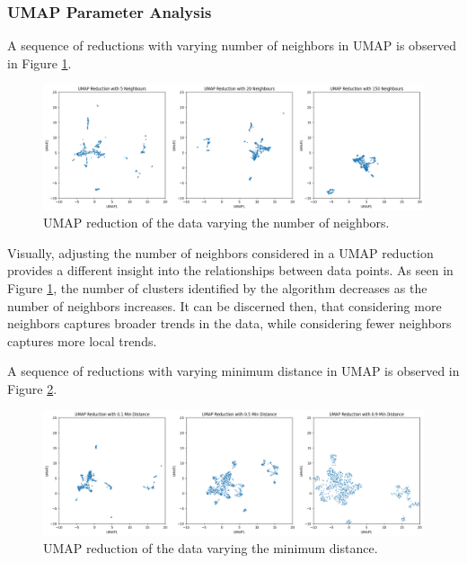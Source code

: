 \documentclass[12pt]{article}
\begin{document}
\subsubsection{UMAP Parameter Analysis}
A sequence of reductions with varying number of neighbors in UMAP is observed in Figure \ref{fig:UMAP_vary}.

\begin{figure}[H]
    \centering
    \includegraphics[width=\textwidth]{Images/UMAP_vary.png}
    \caption{UMAP reduction of the data varying the number of neighbors.}
    \label{fig:UMAP_vary}
\end{figure}

\vspace{-0.5cm}

Visually, adjusting the number of neighbors considered in a UMAP reduction provides a different insight into the relationships between data points. As seen in Figure \ref{fig:UMAP_vary}, the number of clusters identified by the algorithm decreases as the number of neighbors increases. It can be discerned then, that considering more neighbors captures broader trends in the data, while considering fewer neighbors captures more local trends.

A sequence of reductions with varying minimum distance in UMAP is observed in Figure \ref{fig:UMAP_vary2}.

\begin{figure}[H]
    \centering
    \includegraphics[width=\textwidth]{Images/UMAP_vary2.png}
    \caption{UMAP reduction of the data varying the minimum distance.}
    \label{fig:UMAP_vary2}
\end{figure}
\end{document}
